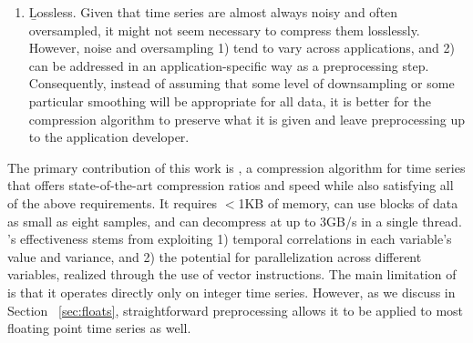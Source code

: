 \begin{enumerate}
\item \b{Lossless}. Given that time series are almost always noisy and often oversampled, it might not seem necessary to compress them losslessly. However, noise and oversampling 1) tend to vary across applications, and 2) can be addressed in an application-specific way as a preprocessing step. Consequently, instead of assuming that some level of downsampling or some particular smoothing will be appropriate for all data, it is better for the compression algorithm to preserve what it is given and leave preprocessing up to the application developer.
\end{enumerate}


The primary contribution of this work is \mine,
a compression algorithm for time series that offers state-of-the-art compression ratios and speed while also satisfying all of the above requirements. It requires $<$1KB of memory, can use blocks of data as small as eight samples, and can decompress at up to 3GB/s in a single thread. \mine's effectiveness stems from exploiting 1) temporal correlations in each variable's value and variance, and 2) the potential for parallelization across different variables, realized through the use of vector instructions. The main limitation of \minesp is that it operates directly only on integer time series. However, as we discuss in Section ~\ref{sec:floats}, straightforward preprocessing allows it to be applied to most floating point time series as well.

